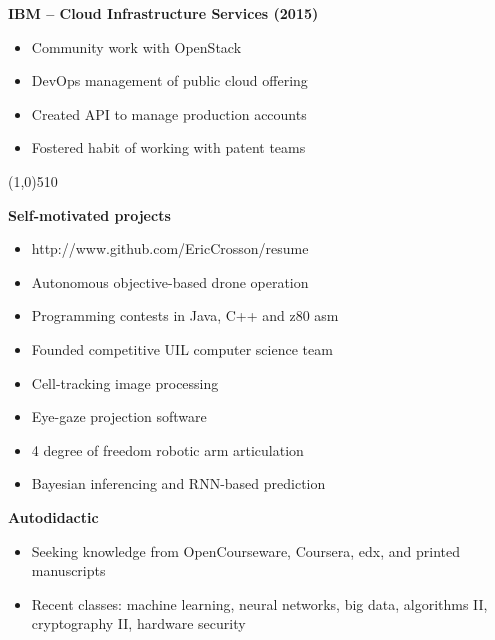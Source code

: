 \documentclass{report}
\newcommand{\cut}{\begin{center} \line(1,0){510} \end{center}}
\begin{document}
\begin{paracol}{2}
  \textbf{IBM -- Cloud Infrastructure Services (2015)}
  \begin{itemize}[label=$\circ$]
  \item Community work with OpenStack
  \item DevOps management of public cloud offering
  \item Created API to manage production accounts
  \item Fostered habit of working with patent teams
  \end{itemize}
\end{paracol}

\cut{}

\textbf{Self-motivated projects}
\begin{paracol}{2}

  \begin{itemize}[label=$\circ$]
  \item http://www.github.com/EricCrosson/resume
  \item Autonomous objective-based drone operation
  \item Programming contests in Java, C++ and z80 asm
  \item Founded competitive UIL computer science team
  \end{itemize}

  \switchcolumn{}
  \begin{itemize}[label=$\circ$]
  \item Cell-tracking image processing
  \item Eye-gaze projection software
  \item 4 degree of freedom robotic arm articulation
  \item Bayesian inferencing and RNN-based prediction
  \end{itemize}
\end{paracol}

\textbf{Autodidactic}
\begin{itemize}[label=$\circ$]
\item Seeking knowledge from OpenCourseware, Coursera, edx, and printed manuscripts
\item Recent classes: machine learning, neural networks, big data, algorithms II,
  cryptography II, hardware security
\end{itemize}


\end{document}
